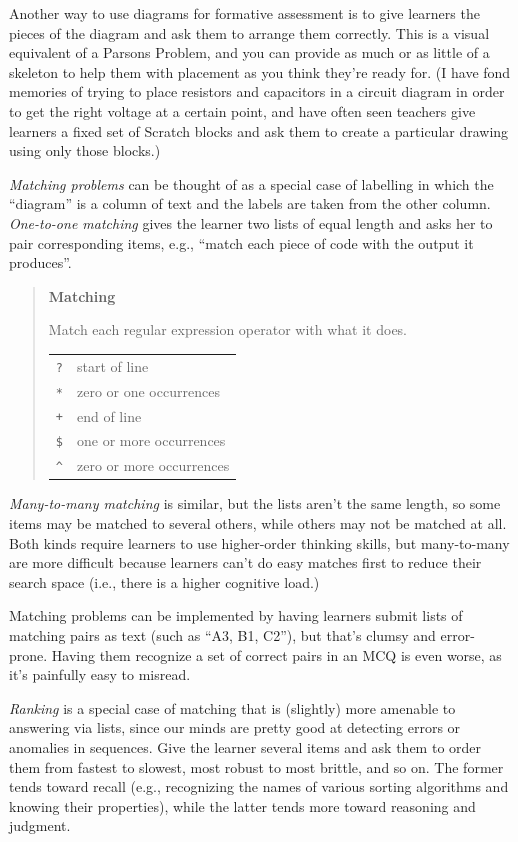 Another way to use diagrams for formative assessment is to give learners
the pieces of the diagram and ask them to arrange them correctly. This
is a visual equivalent of a Parsons Problem, and you can provide as much
or as little of a skeleton to help them with placement as you think
they're ready for. (I have fond memories of trying to place resistors
and capacitors in a circuit diagram in order to get the right voltage at
a certain point, and have often seen teachers give learners a fixed set
of Scratch blocks and ask them to create a particular drawing using only
those blocks.)

\emph{Matching problems} can be thought of as a special case of labelling in
which the ``diagram'' is a column of text and the labels are taken from
the other column. \emph{One-to-one matching} gives the learner two lists of
equal length and asks her to pair corresponding items, e.g., ``match each
piece of code with the output it produces''.

\begin{quote}\setlength{\parindent}{0pt}
\textbf{Matching}

Match each regular expression operator with what it does.

\begin{longtable}[]{@{}ll@{}}
\toprule
\texttt{?} & start of line\tabularnewline
\texttt{*} & zero or one occurrences\tabularnewline
\texttt{+} & end of line\tabularnewline
\texttt{\$} & one or more occurrences\tabularnewline
\texttt{\^{}} & zero or more occurrences\tabularnewline
\bottomrule
\end{longtable}
\end{quote}

\emph{Many-to-many matching} is similar, but the lists aren't the same
length, so some items may be matched to several others, while others may
not be matched at all. Both kinds require learners to use higher-order
thinking skills, but many-to-many are more difficult because learners
can't do easy matches first to reduce their search space (i.e., there is
a higher cognitive load.)

Matching problems can be implemented by having learners submit lists of
matching pairs as text (such as ``A3, B1, C2''), but that's clumsy and
error-prone. Having them recognize a set of correct pairs in an MCQ is
even worse, as it's painfully easy to misread.

\emph{Ranking} is a special case of matching that is (slightly) more amenable
to answering via lists, since our minds are pretty good at detecting
errors or anomalies in sequences. Give the learner several items and ask
them to order them from fastest to slowest, most robust to most brittle,
and so on. The former tends toward recall (e.g., recognizing the names
of various sorting algorithms and knowing their properties), while the
latter tends more toward reasoning and judgment.

